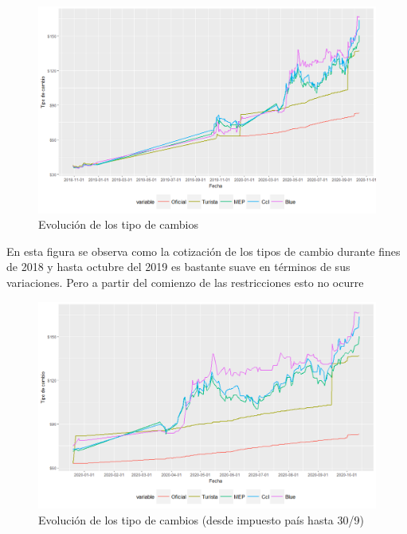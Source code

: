 \documentclass[11pt,a4paper]{article}
\begin{document}
\begin{figure}[H]
\includegraphics[scale=0.45]{1}
\centering
\caption{Evolución de los tipo de cambios}
\end{figure} 

En esta figura se observa como la cotización de los tipos de cambio durante fines de 2018 y hasta octubre del 2019 es bastante suave en términos de sus variaciones. Pero a partir del comienzo de las restricciones esto no ocurre 

\begin{figure}[H]
\includegraphics[scale=0.45]{2}
\centering
\caption{Evolución de los tipo de cambios (desde impuesto país hasta 30/9)}
\end{figure}
\end{document}
